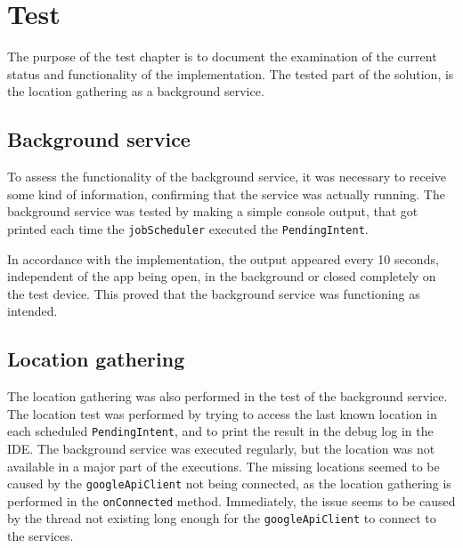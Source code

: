 \section{Test}
The purpose of the test chapter is to document the examination of the current status and functionality of the implementation.
The tested part of the solution, is the location gathering as a background service.


\subsection{Background service}
To assess the functionality of the background service, it was necessary to receive some kind of information, confirming that the service was actually running.
The background service was tested by making a simple console output, that got printed each time the \texttt{jobScheduler} executed the \texttt{PendingIntent}.

In accordance with the implementation, the output appeared every 10 seconds, independent of the app being open, in the background or closed completely on the test device.
This proved that the background service was functioning as intended.

\subsection{Location gathering}
The location gathering was also performed in the test of the background service.
The location test was performed by trying to access the last known location in each scheduled \texttt{PendingIntent}, and to print the result in the debug log in the IDE.
The background service was executed regularly, but the location was not available in a major part of the executions.
The missing locations seemed to be caused by the \texttt{googleApiClient} not being connected, as the location gathering is performed in the \texttt{onConnected} method.
Immediately, the issue seems to be caused by the thread not existing long enough for the \texttt{googleApiClient} to connect to the services.


